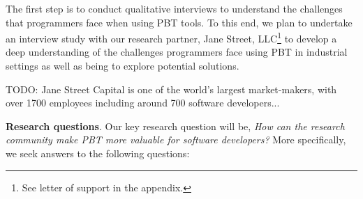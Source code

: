 
The first step is to conduct qualitative interviews to understand the challenges
that programmers face when using PBT tools. To this end, we plan to undertake an
interview study with our research partner, Jane Street, LLC\footnote{See letter
of support in the appendix.} to develop a deep understanding of the challenges
programmers face using PBT in industrial settings as well as being to explore
potential solutions.

TODO: Jane Street Capital is one of the world's largest market-makers,
with over 1700 employees including around 700 software developers...

\textbf{Research questions}.
Our key research question will be, \emph{How can the research community make PBT
more valuable for software developers?} More specifically, we seek
answers to the following questions:

